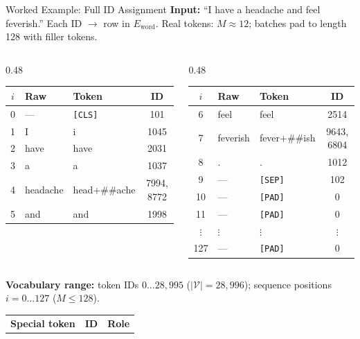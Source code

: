\documentclass[10pt,aspectratio=169]{beamer}
\begin{document}
\begin{frame}{Worked Example: Full ID Assignment}
	\scriptsize
	\textbf{Input:} ``I have a headache and feel feverish.'' \quad Each ID $\to$ row in $E_{\mathrm{word}}$.
	Real tokens: $M \approx 12$; batches pad to length 128 with filler tokens.
	\vspace{0.05cm}
	\begin{columns}[T]
		\begin{column}{0.48\textwidth}
			\begin{tabular}{@{}c l l c@{}}
				\toprule
				$i$ & Raw & Token & ID \\
				\midrule
				0 & --- & \texttt{[CLS]} & 101 \\
				1 & I & i & 1045 \\
				2 & have & have & 2031 \\
				3 & a & a & 1037 \\
				4 & headache & head+\#\#ache & 7994, 8772 \\
				5 & and & and & 1998 \\
				\bottomrule
			\end{tabular}
		\end{column}
		\begin{column}{0.48\textwidth}
			\begin{tabular}{@{}c l l c@{}}
				\toprule
				$i$ & Raw & Token & ID \\
				\midrule
				6 & feel & feel & 2514 \\
				7 & feverish & fever+\#\#ish & 9643, 6804 \\
				8 & . & . & 1012 \\
				9 & --- & \texttt{[SEP]} & 102 \\
				10 & --- & \texttt{[PAD]} & 0 \\
				11 & --- & \texttt{[PAD]} & 0 \\
				$\vdots$ & $\vdots$ & $\vdots$ & $\vdots$ \\
				127 & --- & \texttt{[PAD]} & 0 \\
				\bottomrule
			\end{tabular}
		\end{column}
	\end{columns}
	\vspace{0.06cm}
	\textbf{Vocabulary range:} token IDs $0 \ldots 28{,}995$ ($|\mathcal{V}| = 28{,}996$); sequence positions $i = 0 \ldots 127$ ($M \leq 128$).
	\vspace{0.04cm}
	\begin{tabular}{@{}l c p{7.4cm}@{}}
		\toprule
		\textbf{Special token} & \textbf{ID} & \textbf{Role} \\

\end{tabular}
\end{frame}
\end{document}

